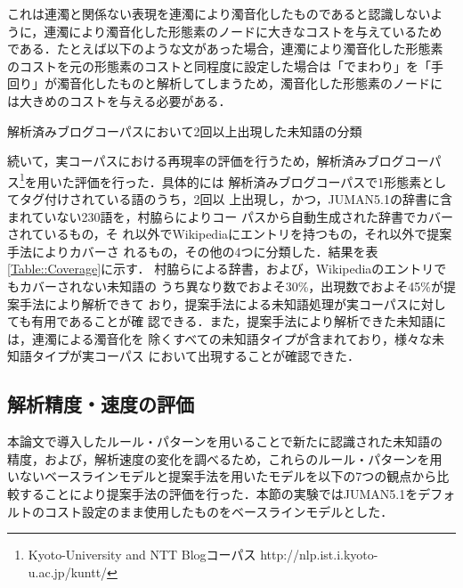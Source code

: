 \documentclass[japanese]{jnlp_1.4}
\begin{document}
  これは連濁と関係ない表現を連濁により濁音化したものであると認識しないよ
  うに，連濁により濁音化した形態素のノードに大きなコストを与えているため
  である．たとえば以下のような文があった場合，連濁により濁音化した形態素
  のコストを元の形態素のコストと同程度に設定した場合は「でまわり」を「手
  回り」が濁音化したものと解析してしまうため，濁音化した形態素のノードに
  は大きめのコストを与える必要がある．

\begin{exe}
\end{exe}

  \begin{table}[t]
   \caption{解析済みブログコーパスにおいて2回以上出現した未知語の分類}
   \label{Table::Coverage}

  \end{table}
 
  続いて，実コーパスにおける再現率の評価を行うため，解析済みブログコーパ
  ス\cite{Hashimoto2011}\footnote{Kyoto-University and NTT Blogコーパス 
  http://nlp.ist.i.kyoto-u.ac.jp/kuntt/}を用いた評価を行った．具体的には
  解析済みブログコーパスで1形態素としてタグ付けされている語のうち，2回以
  上出現し，かつ，JUMAN5.1の辞書に含まれていない230語を，村脇らによりコー
  パスから自動生成された辞書\cite{Murawaki2008}でカバーされているもの，そ
  れ以外でWikipediaにエントリを持つもの，それ以外で提案手法によりカバーさ
  れるもの，その他の4つに分類した．結果を表\ref{Table::Coverage}に示す．
  村脇らによる辞書，および，Wikipediaのエントリでもカバーされない未知語の
  うち異なり数でおよそ30\%，出現数でおよそ45\%が提案手法により解析できて
  おり，提案手法による未知語処理が実コーパスに対しても有用であることが確
  認できる．また，提案手法により解析できた未知語には，連濁による濁音化を
  除くすべての未知語タイプが含まれており，様々な未知語タイプが実コーパス
  において出現することが確認できた．


  \subsection{解析精度・速度の評価}   

  本論文で導入したルール・パターンを用いることで新たに認識された未知語の
  精度，および，解析速度の変化を調べるため，これらのルール・パターンを用
  いないベースラインモデルと提案手法を用いたモデルを以下の7つの観点から比
  較することにより提案手法の評価を行った．本節の実験ではJUMAN5.1をデフォ
  ルトのコスト設定のまま使用したものをベースラインモデルとした．
 
\end{document}
